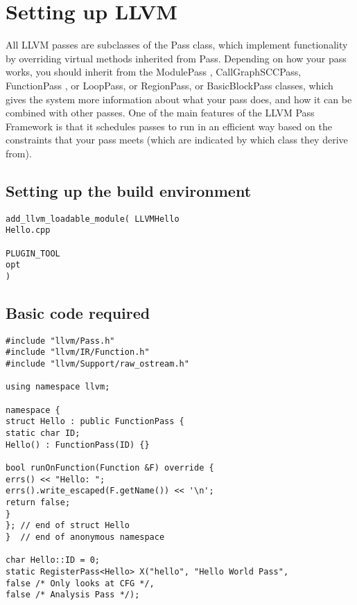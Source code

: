 \chapter{Setting up LLVM}


All LLVM passes are subclasses of the Pass class, which implement functionality by overriding virtual methods inherited from Pass. Depending on how your pass works, you should inherit from the ModulePass , CallGraphSCCPass, FunctionPass , or LoopPass, or RegionPass, or BasicBlockPass classes, which gives the system more information about what your pass does, and how it can be combined with other passes. One of the main features of the LLVM Pass Framework is that it schedules passes to run in an efficient way based on the constraints that your pass meets (which are indicated by which class they derive from).

\section{Setting up the build environment}

\begin{lstlisting}
add_llvm_loadable_module( LLVMHello  
Hello.cpp

PLUGIN_TOOL
opt
)
\end{lstlisting}

\pagebreak
\section{Basic code required}

\begin{lstlisting}
#include "llvm/Pass.h"
#include "llvm/IR/Function.h"
#include "llvm/Support/raw_ostream.h"

using namespace llvm;

namespace {
struct Hello : public FunctionPass {
static char ID;
Hello() : FunctionPass(ID) {}

bool runOnFunction(Function &F) override {
errs() << "Hello: ";
errs().write_escaped(F.getName()) << '\n';
return false;
}
}; // end of struct Hello
}  // end of anonymous namespace

char Hello::ID = 0;
static RegisterPass<Hello> X("hello", "Hello World Pass",
false /* Only looks at CFG */,
false /* Analysis Pass */);
\end{lstlisting}